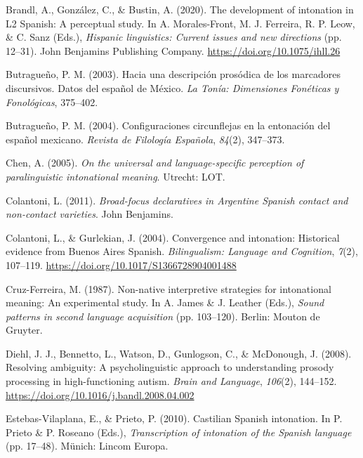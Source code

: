\documentclass[]{article}
\newlength{\cslhangindent}
\newenvironment{CSLReferences}[2] %
 {%
  \setlength{\parindent}{0pt}
  \ifodd #1 \everypar{\setlength{\hangindent}{\cslhangindent}}\ignorespaces\fi
  \ifnum #2 > 0
  \setlength{\parskip}{#2\baselineskip}
  \fi
 }%
 {}
\begin{document}
\begin{CSLReferences}{1}{0}
\leavevmode{}%
Brandl, A., González, C., \& Bustin, A. (2020). The development of intonation in {L}2 {S}panish: {A} perceptual study. In A. Morales-Front, M. J. Ferreira, R. P. Leow, \& C. Sanz (Eds.), \emph{Hispanic linguistics: Current issues and new directions} (pp. 12--31). John Benjamins Publishing Company. \url{https://doi.org/10.1075/ihll.26}

\leavevmode{}%
Butragueño, P. M. (2003). Hacia una descripción prosódica de los marcadores discursivos. {D}atos del español de {M}éxico. \emph{La Tonía: Dimensiones Fonéticas y Fonológicas}, 375--402.

\leavevmode{}%
Butragueño, P. M. (2004). Configuraciones circunflejas en la entonación del español mexicano. \emph{{R}evista de {F}ilología {E}spañola}, \emph{84}(2), 347--373.

\leavevmode{}%
Chen, A. (2005). \emph{On the universal and language-specific perception of paralinguistic intonational meaning}. Utrecht: LOT.

\leavevmode{}%
Colantoni, L. (2011). \emph{Broad-focus declaratives in {A}rgentine {S}panish contact and non-contact varieties}. John Benjamins.

\leavevmode{}%
Colantoni, L., \& Gurlekian, J. (2004). Convergence and intonation: Historical evidence from {Buenos Aires Spanish}. \emph{Bilingualism: Language and Cognition}, \emph{7}(2), 107--119. \url{https://doi.org/10.1017/S1366728904001488}

\leavevmode{}%
Cruz-Ferreira, M. (1987). Non-native interpretive strategies for intonational meaning: An experimental study. In A. James \& J. Leather (Eds.), \emph{Sound patterns in second language acquisition} (pp. 103--120). Berlin: Mouton de Gruyter.

\leavevmode{}%
Diehl, J. J., Bennetto, L., Watson, D., Gunlogson, C., \& McDonough, J. (2008). Resolving ambiguity: {A} psycholinguistic approach to understanding prosody processing in high-functioning autism. \emph{Brain and Language}, \emph{106}(2), 144--152. \url{https://doi.org/10.1016/j.bandl.2008.04.002}

\leavevmode{}%
Estebas-Vilaplana, E., \& Prieto, P. (2010). Castilian {S}panish intonation. In P. Prieto \& P. Roseano (Eds.), \emph{Transcription of intonation of the {S}panish language} (pp. 17--48). Münich: Lincom Europa.


\end{CSLReferences}
\end{document}
